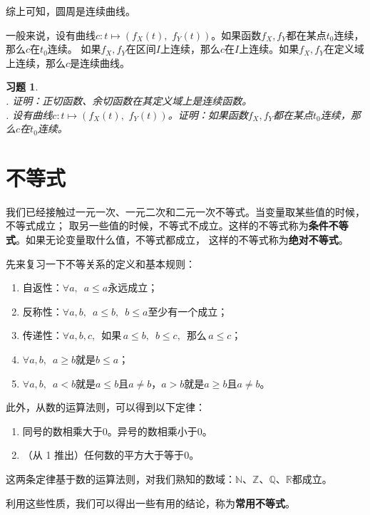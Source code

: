 \documentclass[12pt,UTF8]{ctexbook}
\newtheorem{xt}{习题}[section]
\begin{document}
综上可知，圆周是连续曲线。

一般来说，设有曲线$c: t\mapsto (f_X(t), \,\, f_Y(t))$。如果函数$f_X, f_Y$都在某点$t_0$连续，那么$c$在$t_0$连续。
如果$f_X, f_Y$在区间$I$上连续，那么$c$在$I$上连续。如果$f_X, f_Y$在定义域上连续，那么$c$是连续曲线。

\begin{xt}
    \mbox{} \\
    . 证明：正切函数、余切函数在其定义域上是连续函数。\\
    . 设有曲线$c: t\mapsto (f_X(t), \,\, f_Y(t))$。证明：如果函数$f_X, f_Y$都在某点$t_0$连续，那么$c$在$t_0$连续。
\end{xt}

\chapter{不等式}

我们已经接触过一元一次、一元二次和二元一次不等式。当变量取某些值的时候，不等式成立；
取另一些值的时候，不等式不成立。这样的不等式称为\textbf{条件不等式}。如果无论变量取什么值，不等式都成立，
这样的不等式称为\textbf{绝对不等式}。

先来复习一下不等关系的定义和基本规则：
\begin{enumerate}
    \item 自返性：$\forall a, \,\,\, a \leqslant a$永远成立；
    \item 反称性：$\forall a, b, \,\,\, a \leqslant b, \,\,\, b \leqslant a$至少有一个成立；
    \item 传递性：$\forall a, b, c, \,\,\, \mbox{如果}\, a \leqslant b, \,\,\, b \leqslant c, \,\,\, \mbox{那么}\, a \leqslant c$；
    \item $\forall a, b, \,\,\, a \geqslant b$就是$b \leqslant a$；
    \item $\forall a, b, \,\,\, a < b$就是$a \leqslant b$且$a \neq b$，$ a > b$就是$a \geqslant b$且$a \neq b$。
\end{enumerate}
此外，从数的运算法则，可以得到以下定律：
\begin{enumerate}
    \item 同号的数相乘大于$0$。异号的数相乘小于$0$。
    \item （从 1 推出）任何数的平方大于等于$0$。
\end{enumerate}
这两条定律基于数的运算法则，对我们熟知的数域：$\mathbb{N}$、$\mathbb{Z}$、$\mathbb{Q}$、$\mathbb{R}$都成立。

利用这些性质，我们可以得出一些有用的结论，称为\textbf{常用不等式}。
\end{document}
